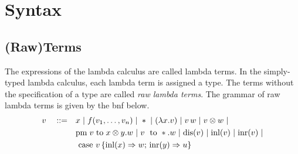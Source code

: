 

\section{Syntax}


\subsection{(Raw)Terms}


The expressions of the lambda calculus are called lambda terms. In the simply-typed lambda calculus, each lambda term is assigned a type. The terms without the specification of a type are called \emph{raw lambda terms}. The grammar of raw lambda terms is given by the \acrfull{bnf} below.
\begin{equation*} \label{eq:grammarlambda}
\begin{split}
 v\hspace{10 pt} ::= \hspace{10 pt}& x \hspace{3 pt} \vert \hspace{3 pt} f(v_1, \ldots, v_n) \hspace{3 pt} \vert \hspace{3 pt} *  \hspace{3 pt} \vert \hspace{3 pt} (\lambda x. v )\hspace{3 pt} \vert \hspace{3 pt} v\,w \hspace{3 pt}  \vert \hspace{3 pt} v \otimes w \hspace{3 pt} \vert
 \\&    \text{pm} \hspace{3 pt} v \hspace{3 pt} \text{to} \hspace{3 pt} x \otimes y. w  \hspace{3 pt}  \vert \hspace{3 pt} v \hspace{3 pt} \text{ to } *.w \hspace{3 pt} \vert \hspace{3 pt} \text{dis}(v) \hspace{3 pt} \vert \hspace{3 pt} \text{inl} (v) \hspace{3 pt} \vert \hspace{3 pt} \text{inr} (v) \hspace{3 pt} \vert
 \\& \text{ case } v \,   \{\text{inl} (x) \Rightarrow w ; \, \text{inr} (y) \Rightarrow u\}
\end{split}
\end{equation*}
